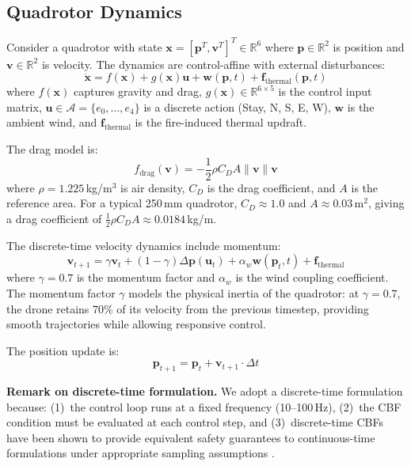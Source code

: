 \documentclass[12pt,a4paper]{article}
\DeclareRobustCommand{\cA}{\mathcal{A}}
\DeclareRobustCommand{\R}{\mathbb{R}}
\DeclareRobustCommand{\vect}[1]{\bm{#1}}
\begin{document}
\subsection{Quadrotor Dynamics}

Consider a quadrotor with state $\vect{x} = [\vect{p}^T, \vect{v}^T]^T \in \R^6$ where $\vect{p} \in \R^2$ is position and $\vect{v} \in \R^2$ is velocity. The dynamics are control-affine with external disturbances:
\begin{equation}
    \dot{\vect{x}} = f(\vect{x}) + g(\vect{x})\vect{u} + \vect{w}(\vect{p}, t) + \vect{f}_{\text{thermal}}(\vect{p}, t)
    \label{eq:dynamics}
\end{equation}
where $f(\vect{x})$ captures gravity and drag, $g(\vect{x}) \in \R^{6 \times 5}$ is the control input matrix, $\vect{u} \in \cA = \{e_0, \ldots, e_4\}$ is a discrete action (Stay, N, S, E, W), $\vect{w}$ is the ambient wind, and $\vect{f}_{\text{thermal}}$ is the fire-induced thermal updraft.

The drag model is:
\begin{equation}
    f_{\text{drag}}(\vect{v}) = -\frac{1}{2}\rho C_D A \|\vect{v}\| \vect{v}
\end{equation}
where $\rho = 1.225$\,kg/m$^3$ is air density, $C_D$ is the drag coefficient, and $A$ is the reference area. For a typical 250\,mm quadrotor, $C_D \approx 1.0$ and $A \approx 0.03$\,m$^2$, giving a drag coefficient of $\frac{1}{2}\rho C_D A \approx 0.0184$\,kg/m.

The discrete-time velocity dynamics include momentum:
\begin{equation}
    \vect{v}_{t+1} = \gamma \vect{v}_t + (1 - \gamma)\Delta\vect{p}(\vect{u}_t) + \alpha_w \vect{w}(\vect{p}_t, t) + \vect{f}_{\text{thermal}}
\end{equation}
where $\gamma = 0.7$ is the momentum factor and $\alpha_w$ is the wind coupling coefficient. The momentum factor $\gamma$ models the physical inertia of the quadrotor: at $\gamma = 0.7$, the drone retains 70\% of its velocity from the previous timestep, providing smooth trajectories while allowing responsive control.

The position update is:
\begin{equation}
    \vect{p}_{t+1} = \vect{p}_t + \vect{v}_{t+1} \cdot \Delta t
\end{equation}

\textbf{Remark on discrete-time formulation.} We adopt a discrete-time formulation because: (1)~the control loop runs at a fixed frequency (10--100\,Hz), (2)~the CBF condition must be evaluated at each control step, and (3)~discrete-time CBFs have been shown to provide equivalent safety guarantees to continuous-time formulations under appropriate sampling assumptions \cite{Ames2019}.
\end{document}
